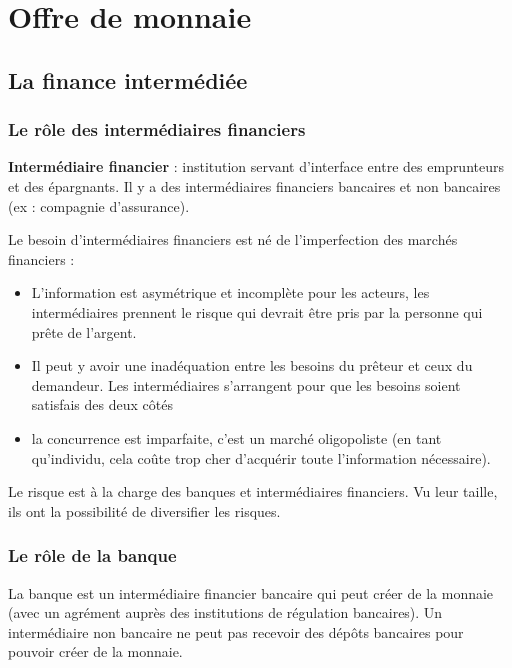 \chapter{Offre de monnaie}

\section{La finance intermédiée}

	\subsection{Le rôle des intermédiaires financiers}
	
	\textbf{Intermédiaire financier} : institution servant d'interface entre des emprunteurs et des épargnants. Il y a des intermédiaires financiers bancaires et non bancaires (ex : compagnie d'assurance).
	
	Le besoin d'intermédiaires financiers est né de l'imperfection des marchés financiers :
	
	\begin{itemize}
		\item L'information est asymétrique et incomplète pour les acteurs, les intermédiaires prennent le risque qui devrait être pris par la personne qui prête de l'argent.
	
		\item Il peut y avoir une inadéquation entre les besoins du prêteur et ceux du demandeur. Les intermédiaires s'arrangent pour que les besoins soient satisfais des deux côtés
		
		\item la concurrence est imparfaite, c'est un marché oligopoliste (en tant qu'individu, cela coûte trop cher d'acquérir toute l'information nécessaire).
\end{itemize}
	Le risque est à la charge des banques et intermédiaires financiers. Vu leur taille, ils ont la possibilité de diversifier les risques.
	
	
	\subsection{Le rôle de la banque}
	
	La banque est un intermédiaire financier bancaire qui peut créer de la monnaie (avec un agrément auprès des institutions de régulation bancaires). Un intermédiaire non bancaire ne peut pas recevoir des dépôts bancaires pour pouvoir créer de la monnaie.
	
